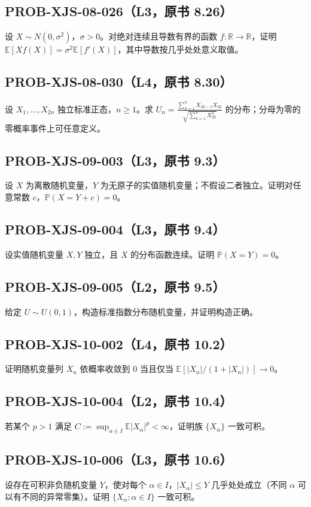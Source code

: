 \documentclass[UTF8]{ctexart}
\begin{document}
\subsection*{PROB-XJS-08-026（L3，原书 8.26）}
设 $X\sim N(0,\sigma^2)$，$\sigma>0$。对绝对连续且导数有界的函数 $f:\mathbb R\to\mathbb R$，证明 $\mathbb E[Xf(X)]=\sigma^2\mathbb E[f'(X)]$，其中导数按几乎处处意义取值。

\subsection*{PROB-XJS-08-030（L4，原书 8.30）}
设 $X_1,\ldots,X_{2n}$ 独立标准正态，$n\ge1$。求 $U_n=\frac{\sum_{k=1}^nX_{2k-1}X_{2k}}{\sqrt{\sum_{k=1}^nX_{2k}^2}}$ 的分布；分母为零的零概率事件上可任意定义。

\subsection*{PROB-XJS-09-003（L3，原书 9.3）}
设 $X$ 为离散随机变量，$Y$ 为无原子的实值随机变量；不假设二者独立。证明对任意常数 $c$，$\mathbb P(X=Y+c)=0$。

\subsection*{PROB-XJS-09-004（L3，原书 9.4）}
设实值随机变量 $X,Y$ 独立，且 $X$ 的分布函数连续。证明 $\mathbb P(X=Y)=0$。

\subsection*{PROB-XJS-09-005（L2，原书 9.5）}
给定 $U\sim U(0,1)$，构造标准指数分布随机变量，并证明构造正确。

\subsection*{PROB-XJS-10-002（L4，原书 10.2）}
证明随机变量列 $X_n$ 依概率收敛到 $0$ 当且仅当 $\mathbb E[|X_n|/(1+|X_n|)]\to0$。

\subsection*{PROB-XJS-10-004（L2，原书 10.4）}
若某个 $p>1$ 满足 $C:=\sup_{\alpha\in I}\mathbb E|X_\alpha|^p<\infty$，证明族 $\{X_\alpha\}$ 一致可积。

\subsection*{PROB-XJS-10-006（L3，原书 10.6）}
设存在可积非负随机变量 $Y$，使对每个 $\alpha\in I$，$|X_\alpha|\le Y$ 几乎处处成立（不同 $\alpha$ 可以有不同的异常零集）。证明 $\{X_\alpha:\alpha\in I\}$ 一致可积。
\end{document}

